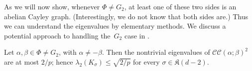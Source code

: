 \documentclass[11pt]{article}
\newcommand{\CC}[2]{\mathcal{C}\mathcal{C}(#1;#2)}
\newcommand{\Link}{\mathrm{Link}}
\newcommand{\complex}{\mathfrak{K}}
\begin{document}
As we will now show, whenever $\Phi \neq G_2$, at least one of these two sides is an abelian Cayley graph. (Interestingly, we do not know that both sides are.)  Thus we can understand the eigenvalues by elementary methods.  We discuss a potential approach to handling the~$G_2$ case in .

\begin{theorem}\label{thm:linkexpand}
        Let $\alpha, \beta \in \Phi \neq G_2$, with $\alpha \neq -\beta$. 
        Then the nontrivial eigenvalues of $\CC{\alpha}{\beta}^2$ are at most $2/p$; hence $\lambda_2(K_\sigma) \leq \sqrt{2/p}$ for every $\sigma \in \complex(d-2)$.
\end{theorem}
\end{document}
